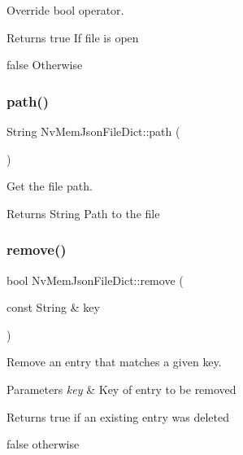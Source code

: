 Override bool operator. 

\begin{DoxyReturn}{Returns}
true If file is open 

false Otherwise 
\end{DoxyReturn}
\mbox{\label{class_nv_mem_json_file_dict_a9cf7220ebdf23d391790506e165e14d7}} 
\subsubsection{\texorpdfstring{path()}{path()}}
{\footnotesize\ttfamily String Nv\+Mem\+Json\+File\+Dict\+::path (\begin{DoxyParamCaption}{ }\end{DoxyParamCaption})}



Get the file path. 

\begin{DoxyReturn}{Returns}
String Path to the file 
\end{DoxyReturn}
\mbox{\label{class_nv_mem_json_file_dict_a6e0bd4044fc8a65c10a1ed1da5dd8a55}} 
\subsubsection{\texorpdfstring{remove()}{remove()}}
{\footnotesize\ttfamily bool Nv\+Mem\+Json\+File\+Dict\+::remove (\begin{DoxyParamCaption}\item[{const String \&}]{key }\end{DoxyParamCaption})\hspace{0.3cm}{\ttfamily [virtual]}}



Remove an entry that matches a given {\ttfamily key}. 


\begin{DoxyParams}{Parameters}
{\em key} & Key of entry to be removed \\
\hline
\end{DoxyParams}
\begin{DoxyReturn}{Returns}
true if an existing entry was deleted 

false otherwise 
\end{DoxyReturn}


